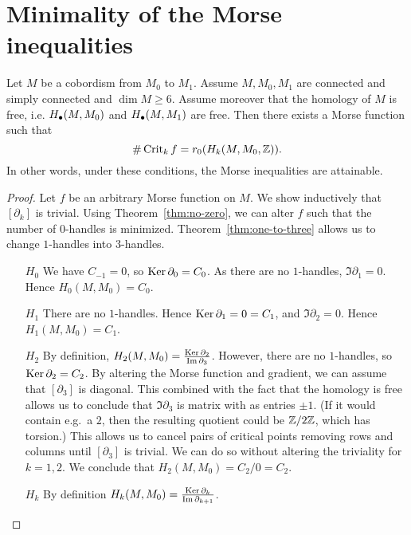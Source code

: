 \section{Minimality of the Morse inequalities}
\begin{theorem}
    Let $M$ be a cobordism from $M_0$ to $M_1$.
    Assume $M, M_0, M_1$ are connected and simply connected and $\dim M \ge 6$.
    Assume moreover that the homology of $M$ is free, i.e.  $H_{\bullet}(M, M_0)$ and $H_{\bullet}(M, M_1)$ are free.
    Then there exists a Morse function such that
    \[
        \# \operatorname{Crit}_k f = r_0(H_k(M, M_0, \mathbb{Z}))
    .\] 
    In other words, under these conditions, the Morse inequalities are attainable.
    \label{thm:minimal-cob}
\end{theorem}
\begin{proof}
    Let $f$ be an arbitrary Morse function on $M$.
    We show inductively that $[\partial_k]$ is trivial.
    Using Theorem~\ref{thm:no-zero}, we can alter $f$ such that the number of $0$-handles is minimized.
    Theorem~\ref{thm:one-to-three} allows us to change $1$-handles into $3$-handles.
    \begin{enumerate}
        \item[$H_0$]
            We have $C_{-1} = 0$, so $\operatorname{Ker} \partial_0 = C_0$.
            As there are no $1$-handles, $\Im \partial_1 = 0$.
            Hence  $H_0(M, M_0) = C_0$.
        \item[$H_1$]
            There are no $1$-handles.
            Hence $\operatorname{Ker} \partial_1 = 0 = C_1$, and $\Im \partial_2 = 0$. Hence  $H_1(M, M_0) = C_1$.
        \item[$ H_2$]
            By definition, $H_2(M, M_0) = \frac{\operatorname{Ker} \partial_2}{\operatorname{Im} \partial_3}$.
            However, there are no $1$-handles,
            so $\operatorname{Ker} \partial_2 = C_2$.
            By altering the Morse function and gradient, we can assume that $[\partial_3]$ is diagonal.
            This combined with the fact that the homology is free allows us to conclude that $\Im \partial_3$ is matrix with as entries $\pm 1$.
            (If it would contain e.g.\ a $2$, then the resulting quotient could be  $\mathbb{Z} / 2 \mathbb{Z}$, which has torsion.)
            This allows us to cancel pairs of critical points removing rows and columns until $[\partial_3]$ is trivial.
            We can do so without altering the triviality for $k = 1,2$.
            We conclude that $H_2(M, M_0) = C_2 / 0 = C_2$.
        \item [$H_k$]
            By definition $H_k(M, M_0) = \frac{\operatorname{Ker} \partial_k}{\operatorname{Im} \partial_{k+1}}$.

\end{enumerate}
\end{proof}
